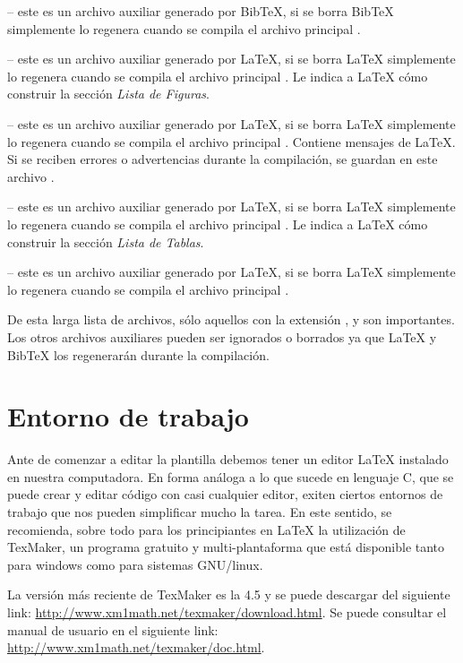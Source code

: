  -- este es un archivo auxiliar generado por BibTeX, si se borra BibTeX simplemente lo regenera cuando se compila el archivo principal .

 -- este es un archivo auxiliar generado por \LaTeX{}, si se borra \LaTeX{} simplemente lo regenera cuando se compila el archivo principal .  Le indica a \LaTeX{} cómo construir la sección \emph{Lista de Figuras}.
 
 --  este es un archivo auxiliar generado por \LaTeX{}, si se borra \LaTeX{} simplemente lo regenera cuando se compila el archivo principal . Contiene mensajes de \LaTeX{}. Si se reciben errores o advertencias durante la compilación, se guardan en este archivo .

 -- este es un archivo auxiliar generado por \LaTeX{}, si se borra \LaTeX{} simplemente lo regenera cuando se compila el archivo principal .  Le indica a \LaTeX{} cómo construir la sección \emph{Lista de Tablas}.

 -- este es un archivo auxiliar generado por \LaTeX{}, si se borra \LaTeX{} simplemente lo regenera cuando se compila el archivo principal .

De esta larga lista de archivos, sólo aquellos con la extensión ,  y  son importantes.  Los otros archivos auxiliares pueden ser ignorados o borrados ya que \LaTeX{} y BibTeX los regenerarán durante la compilación.


\section{Entorno de trabajo}

Ante de comenzar a editar la plantilla debemos tener un editor \LaTeX{} instalado en nuestra computadora.  En forma análoga a lo que sucede en lenguaje C, que se puede crear y editar código con casi cualquier editor, exiten ciertos entornos de trabajo que nos pueden simplificar mucho la tarea.  En este sentido, se recomienda, sobre todo para los principiantes en \LaTeX{} la utilización de TexMaker, un programa gratuito y multi-plantaforma que está disponible tanto para windows como para sistemas GNU/linux.

La versión más reciente de TexMaker es la 4.5 y se puede descargar del siguiente link: \url{http://www.xm1math.net/texmaker/download.html}. Se puede consultar el manual de usuario en el siguiente link: \url{http://www.xm1math.net/texmaker/doc.html}.
 


